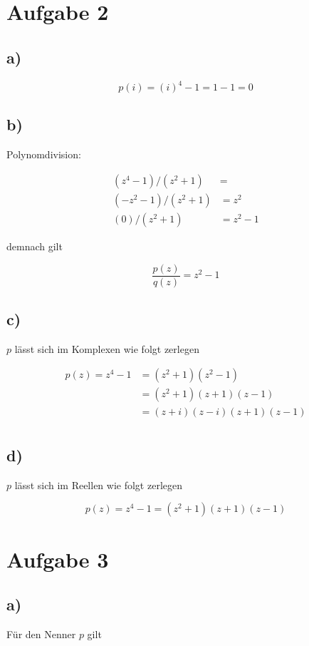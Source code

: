 \documentclass[a4paper, 11pt]{article}
\begin{document}
\section{Aufgabe 2}
\label{sec:orgcfd6450}
\subsection{a)}
\label{sec:org96c0ce9}
$$ p(i) = (i)^4 - 1 = 1 - 1 = 0 $$

\subsection{b)}
\label{sec:orgb75fe93}
Polynomdivision:

\begin{align*}
    (z^4 - 1) / (z^2 + 1) &= \\
    (-z^2 - 1) / (z^2 + 1) &= z^2 \\
    (0) / (z^2 + 1) &= z^2 - 1 
\end{align*}

demnach gilt

$$ \frac{p(z)}{q(z)} = z^2 - 1 $$

\subsection{c)}
\label{sec:org894e187}
\(p\) lässt sich im Komplexen wie folgt zerlegen

\begin{align*}
    p(z) = z^4 - 1 &= (z^2 + 1)(z^2 - 1) \\
    &= (z^2 + 1)(z + 1)(z - 1) \\
    &= (z + i)(z - i)(z + 1)(z - 1) \\
\end{align*}

\subsection{d)}
\label{sec:org0dff2c6}
\(p\) lässt sich im Reellen wie folgt zerlegen

$$ p(z) = z^4 - 1 = (z^2 + 1)(z + 1)(z - 1) $$

\section{Aufgabe 3}
\label{sec:orgc229687}
\subsection{a)}
\label{sec:orgfe3f041}
Für den Nenner \(p\) gilt
\end{document}
